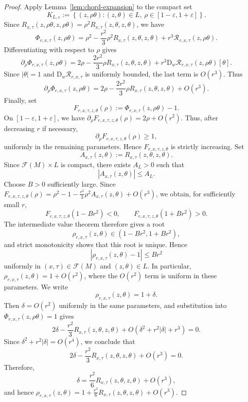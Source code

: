 \documentclass[11pt]{article}
\theoremstyle{remark}
\numberwithin{equation}{section}
\begin{document}
\begin{proof}
Apply Lemma~\ref{lem:chord-expansion} to the compact set
\[
K_{L,\varepsilon}
:=
\left\{
(z,\rho\theta):
(z,\theta)\in L,\ 
\rho\in[1-\varepsilon,1+\varepsilon]
\right\}.
\]
Since $R_{x,\tau}(z,\rho\theta,z,\rho\theta)
=
\rho^2R_{x,\tau}(z,\theta,z,\theta)$,
we have
\[
\Phi_{r,x,\tau}(z,\rho\theta)
=
\rho^2
-\frac{r^2}{3}\rho^2
R_{x,\tau}(z,\theta,z,\theta)
+r^3\mathcal R_{r,x,\tau}(z,\rho\theta).
\]
Differentiating with respect to $\rho$ gives
\[
\partial_\rho\Phi_{r,x,\tau}(z,\rho\theta)
=
2\rho
-\frac{2r^2}{3}\rho
R_{x,\tau}(z,\theta,z,\theta)
+r^3
\mathrm D_w\mathcal R_{r,x,\tau}(z,\rho\theta)[\theta].
\]
Since $|\theta|=1$ and $\mathrm D_w\mathcal R_{r,x,\tau}$ is uniformly
bounded, the last term is $O(r^3)$.  Thus
\[
\partial_\rho\Phi_{r,x,\tau}(z,\rho\theta)
=
2\rho
-\frac{2r^2}{3}\rho
R_{x,\tau}(z,\theta,z,\theta)
+O(r^3).
\]
Finally, set
\[
F_{r,x,\tau,z,\theta}(\rho)
:=
\Phi_{r,x,\tau}(z,\rho\theta)-1.
\]
On $[1-\varepsilon,1+\varepsilon]$, we have
$\partial_\rho F_{r,x,\tau,z,\theta}(\rho)=2\rho+O(r^2)$.
Thus,
after decreasing $r$ if necessary,
\[
\partial_\rho F_{r,x,\tau,z,\theta}(\rho)\ge1,
\]
uniformly in the remaining parameters.  Hence
$F_{r,x,\tau,z,\theta}$ is strictly increasing.
Set
\[
A_{x,\tau}(z,\theta)
:=
R_{x,\tau}(z,\theta,z,\theta).
\]
Since $\mathcal F(M)\times L$ is compact, there exists $A_L>0$ such that
\[
|A_{x,\tau}(z,\theta)|\le A_L.
\]
Choose $B>0$ sufficiently large.
Since $F_{r,x,\tau,z,\theta}(\rho)
=
\rho^2-1
-\frac{r^2}{3}\rho^2A_{x,\tau}(z,\theta)
+O(r^3)$,
we obtain, for sufficiently small $r$,
\[
F_{r,x,\tau,z,\theta}(1-Br^2)<0,
\qquad
F_{r,x,\tau,z,\theta}(1+Br^2)>0.
\]
The intermediate value theorem therefore gives a root
\[
\rho_{r,x,\tau}(z,\theta)
\in(1-Br^2,1+Br^2),
\]
and strict monotonicity shows that this root is unique.  Hence
\[
\left|
\rho_{r,x,\tau}(z,\theta)-1
\right|
\le Br^2
\]
uniformly in $(x,\tau)\in\mathcal F(M)$ and $(z,\theta)\in L$.
In particular,
$\rho_{r,x,\tau}(z,\theta)
=
1+O(r^2)$,
where the $O(r^2)$ term is uniform in these parameters.
We write
\[
\rho_{r,x,\tau}(z,\theta)=1+\delta.
\]
Then $\delta=O(r^2)$ uniformly in the same parameters, and substitution into
$\Phi_{r,x,\tau}(z,\rho\theta)=1$
gives
\[
2\delta
-\frac{r^2}{3}R_{x,\tau}(z,\theta,z,\theta)
+O\!\left(\delta^2+r^2|\delta|+r^3\right)
=0.
\]
Since
$\delta^2+r^2|\delta|=O(r^4)$,
we conclude that
\[
2\delta
-\frac{r^2}{3}R_{x,\tau}(z,\theta,z,\theta)
+O(r^3)
=0.
\]
Therefore,
\[
\delta
=
\frac{r^2}{6}R_{x,\tau}(z,\theta,z,\theta)
+O(r^3),
\]
and hence
$\rho_{r,x,\tau}(z,\theta)
=
1+\frac{r^2}{6}
R_{x,\tau}(z,\theta,z,\theta)
+O(r^3)$.
\end{proof}
\end{document}
